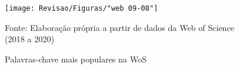 \begin{figure}[H]
	\centering
	\caption{Palavras-chave mais populares na WoS}
	\label{fig:web-09-08}
	\texttt{[image: Revisao/Figuras/"web 09-08"]}
	
	
	\vspace{0.2cm}
	Fonte: Elaboração própria a partir de dados da Web of Science (2018 a 2020)
\end{figure}